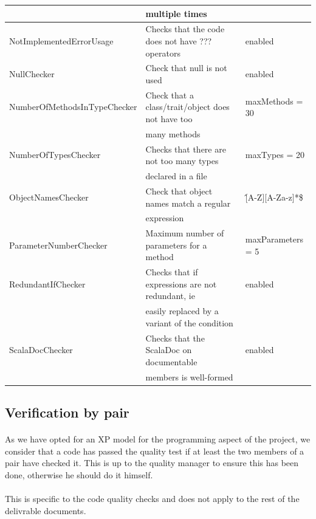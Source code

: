 \documentclass{report}
\begin{document}
\begin{center}
\begin{longtable}{|l|l|l|}
& \small{multiple times} & \\
\hline
\small{NotImplementedErrorUsage} & \small{Checks that the code does not have ??? operators} & enabled \\
\hline
NullChecker & \small{Check that null is not used} & enabled \\
\hline
\small{NumberOfMethodsInTypeChecker} & \small{Check that a class/trait/object does not have too} & maxMethods = 30 \\
& \small{many methods} & \\
\hline
NumberOfTypesChecker & \small{Checks that there are not too many types} & maxTypes = 20 \\
& \small{declared in a file} & \\
\hline
ObjectNamesChecker & \small{Check that object names match a regular}  & \^[A-Z][A-Za-z]*\$ \\
& \small{expression} & \\
\hline
ParameterNumberChecker & \small{Maximum number of parameters for a method} & maxParameters = 5 \\
\hline
RedundantIfChecker & \small{Checks that if expressions are not redundant, ie} & enabled \\
& \small{easily replaced by a variant of the condition} &  \\
\hline
ScalaDocChecker & \small{Checks that the ScalaDoc on documentable}  & enabled \\
& \small{members is well-formed} & \\
\hline
\end{longtable} 
\end{center}
\renewcommand{\arraystretch}{1}
\subsection{Verification by pair}

\paragraph{}
\hspace{4mm}\textnormal{As we have opted for an XP model for the programming aspect of the project,
we consider that a code has passed the quality test if at least the two members of a pair
have checked it. This is up to the quality manager to ensure this has been done, otherwise he
should do it himself.}

\paragraph{}
\hspace{4mm}\textnormal{This is specific to the code quality checks and does not apply to the rest of the delivrable documents.}
\end{document}
